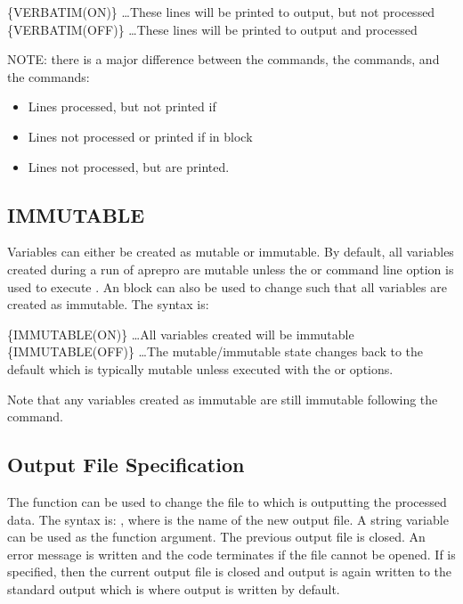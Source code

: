 \begin{apinp}
\{VERBATIM(ON)\}
\ldots These lines will be printed to output, but not processed
\{VERBATIM(OFF)\}
\ldots These lines will be printed to output and processed
\end{apinp}
NOTE:  there  is  a  major  difference  between  the   commands, 
the commands, and the  commands:

\begin{itemize}
\item {} Lines processed, but not printed if 
\item {} Lines not processed or printed if in  block
\item {} Lines not processed, but are printed.
\end{itemize}

\subsection{IMMUTABLE}\label{immutable_block} Variables can either be
created as mutable or immutable.  By default, all variables created
during a run of aprepro are mutable unless the  or
 command line option is used to execute \aprepro{}.  An
 block can also be used to change \aprepro{} such that
all variables are created as immutable.  The syntax is:
\begin{apinp}
\{IMMUTABLE(ON)\}
\ldots All variables created will be immutable
\{IMMUTABLE(OFF)\}
\ldots The mutable/immutable state changes back to the default which
is typically mutable unless \aprepro{} executed with the
 or  options.
\end{apinp}
Note that any variables created as immutable are still immutable
following the  command.

\subsection{Output File Specification} The  function can be used 
to change the file to which \aprepro{} is outputting the processed
data.  The syntax is: , where
 is the name of the new output file. A string variable
can be used as the function argument. The previous output file is
closed. An error message is written and the code terminates if the
file cannot be opened. If  is specified,
then the current output file is closed and output is again written to
the standard output which is where output is written by default.

